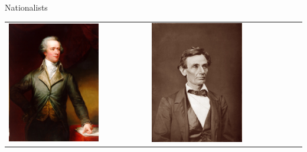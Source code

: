 % 
\begin{frame}{Nationalists}
\begin{table}[h]
\centering
\begin{tabular}{lcccccc} 
    \includegraphics[width=0.75\textwidth,height=.3\textheight,keepaspectratio=true]{img/hamilton-portrait.png} &
    \includegraphics[width=0.75\textwidth,height=.3\textheight,keepaspectratio=true]{img/lincoln-portrait.png} &

\end{tabular}
\end{table}
\end{frame}
